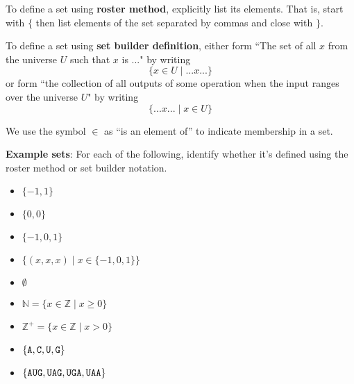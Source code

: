 
To define a set using {\bf roster method}, explicitly list its elements. That is,
start with $\{$ then list elements of 
the set separated by commas and close with $\}$.

To define a set using {\bf set builder definition}, either form 
``The set of all $x$ from the universe $U$ such that $x$ is ..." by writing
\[\{x \in U \mid ...x... \}\]
or form ``the collection of all outputs of some operation when the input ranges over the universe $U$"
by writing
\[\{ ...x... \mid x\in U \}\]

We use the symbol $\in$ as ``is an element of'' to indicate membership in a set.

{\bf Example sets}: For each of the following, identify whether it's defined using the roster method
or set builder notation.
\begin{itemize}
    \item[]$\{ -1, 1\}$
    \item[]$\{0, 0 \}$
    \item[]$\{-1, 0, 1 \}$
    \item[]$\{(x,x,x) \mid x \in \{-1,0,1\} \}$
    \item[]$\emptyset$
    \item[]$\mathbb{N} = \{ x \in \mathbb{Z} \mid x \geq 0 \}$
    \item[]$\mathbb{Z}^+ = \{ x \in \mathbb{Z}  \mid x > 0 \}$
    \item[]$\{\texttt{A},\texttt{C},\texttt{U},\texttt{G}\}$ 
    \item[]$\{\texttt{A}\texttt{U}\texttt{G}, \texttt{U}\texttt{A}\texttt{G}, \texttt{U}\texttt{G}\texttt{A}, \texttt{U}\texttt{A}\texttt{A} \}$
\end{itemize}
\vfill